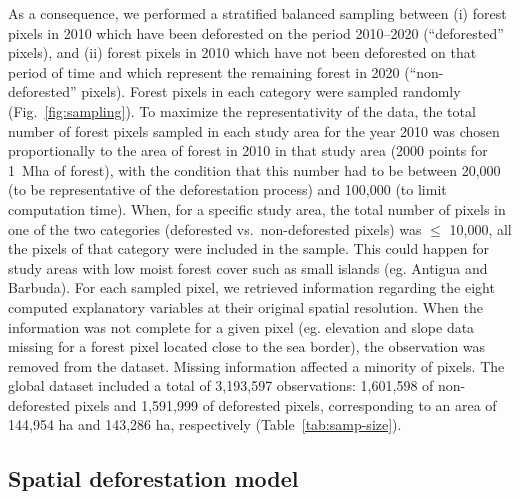\documentclass[
  12pt,
]{article}
\begin{document}
As a consequence, we performed a stratified balanced sampling between (i) forest pixels in 2010 which have been deforested on the period 2010--2020 (``deforested'' pixels), and (ii) forest pixels in 2010 which have not been deforested on that period of time and which represent the remaining forest in 2020 (``non-deforested'' pixels). Forest pixels in each category were sampled randomly (Fig.~\ref{fig:sampling}). To maximize the representativity of the data, the total number of forest pixels sampled in each study area for the year 2010 was chosen proportionally to the area of forest in 2010 in that study area (2000 points for 1~Mha of forest), with the condition that this number had to be between 20,000 (to be representative of the deforestation process) and 100,000 (to limit computation time). When, for a specific study area, the total number of pixels in one of the two categories (deforested vs.~non-deforested pixels) was \(\leq\) 10,000, all the pixels of that category were included in the sample. This could happen for study areas with low moist forest cover such as small islands (eg. Antigua and Barbuda). For each sampled pixel, we retrieved information regarding the eight computed explanatory variables at their original spatial resolution. When the information was not complete for a given pixel (eg. elevation and slope data missing for a forest pixel located close to the sea border), the observation was removed from the dataset. Missing information affected a minority of pixels. The global dataset included a total of 3,193,597 observations: 1,601,598 of non-deforested pixels and 1,591,999 of deforested pixels, corresponding to an area of 144,954 ha and 143,286 ha, respectively (Table~\ref{tab:samp-size}).

\hypertarget{spatial-deforestation-model}{%
\subsection{Spatial deforestation model}\label{spatial-deforestation-model}}
\end{document}
